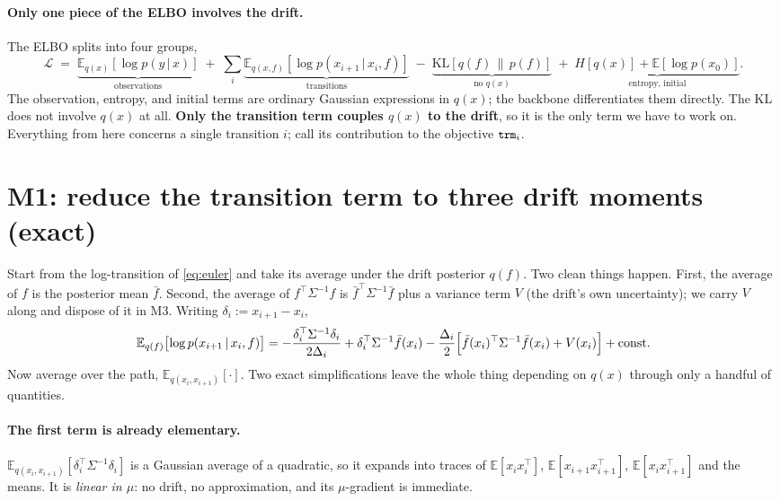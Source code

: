 \documentclass[11pt]{article}
\newcommand{\E}{\mathbb{E}}
\newcommand{\Eqxx}{\E_{q(x_i,x_{i+1})}}
\newcommand{\given}{\,|\,}
\newcommand{\code}[1]{\texttt{\small #1}}
\begin{document}
\paragraph{Only one piece of the ELBO involves the drift.}
The ELBO splits into four groups,
\begin{equation}
\mathcal L \;=\;
\underbrace{\E_{q(x)}[\log p(y\given x)]}_{\text{observations}}
\;+\; \sum_i \underbrace{\E_{q(x,f)}[\log p(x_{i+1}\given x_i,f)]}_{\text{transitions}}
\;-\; \underbrace{\mathrm{KL}[q(f)\,\|\,p(f)]}_{\text{no }q(x)}
\;+\; \underbrace{H[q(x)] + \E[\log p(x_0)]}_{\text{entropy, initial}} .
\end{equation}
The observation, entropy, and initial terms are ordinary Gaussian
expressions in $q(x)$; the backbone differentiates them directly. The KL
does not involve $q(x)$ at all. \textbf{Only the transition term couples
$q(x)$ to the drift}, so it is the only term we have to work on.
Everything from here concerns a single transition $i$; call its
contribution to the objective $\code{trm}_i$.

\section{M1: reduce the transition term to three drift moments (exact)}

Start from the log-transition of \eqref{eq:euler} and take its average
under the drift posterior $q(f)$. Two clean things happen. First, the
average of $f$ is the posterior mean $\bar f$. Second, the average of
$f^\top\Sigma^{-1}f$ is $\bar f^\top\Sigma^{-1}\bar f$ plus a variance
term $V$ (the drift's own uncertainty); we carry $V$ along and dispose of
it in M3. Writing $\delta_i := x_{i+1}-x_i$,
\begin{equation}
\E_{q(f)}\bigl[\log p(x_{i+1}\given x_i,f)\bigr]
= -\frac{\delta_i^\top\Sigma^{-1}\delta_i}{2\Delta_i}
+ \delta_i^\top\Sigma^{-1}\bar f(x_i)
- \frac{\Delta_i}{2}\Bigl[\bar f(x_i)^\top\Sigma^{-1}\bar f(x_i) + V(x_i)\Bigr]
+ \text{const}.
\label{eq:qf-averaged}
\end{equation}
Now average over the path, $\Eqxx[\cdot]$. Two exact simplifications
leave the whole thing depending on $q(x)$ through only a handful of
quantities.

\paragraph{The first term is already elementary.}
$\Eqxx[\delta_i^\top\Sigma^{-1}\delta_i]$ is a Gaussian average of a
quadratic, so it expands into traces of $\E[x_ix_i^\top]$,
$\E[x_{i+1}x_{i+1}^\top]$, $\E[x_ix_{i+1}^\top]$ and the means. It is
\emph{linear in $\mu$}: no drift, no approximation, and its
$\mu$-gradient is immediate.
\end{document}
